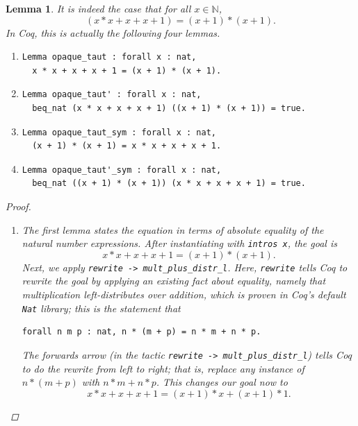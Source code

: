 \documentclass[12pt,notitlepage]{report}
\theoremstyle{plain}
\newtheorem{lem}[theo]{Lemma}
\theoremstyle{definition}
\newcommand\N{\mathbb{N}}
\numberwithin{equation}{section}
\begin{document}
\begin{lem}\label{opaqueness}
    It is indeed the case that for all $x\in \N$,\[
	(x * x + x + x + 1) = (x + 1) * (x + 1).
    \] 
    In Coq, this is actually the following four lemmas.
    \begin{enumerate}
        \item\label{opaqueA} \begin{verbatim}Lemma opaque_taut : forall x : nat, 
  x * x + x + x + 1 = (x + 1) * (x + 1).\end{verbatim}
        \item\label{opaqueB} \begin{verbatim}Lemma opaque_taut' : forall x : nat, 
  beq_nat (x * x + x + x + 1) ((x + 1) * (x + 1)) = true.\end{verbatim}
        \item\label{opaqueC} \begin{verbatim}Lemma opaque_taut_sym : forall x : nat, 
  (x + 1) * (x + 1) = x * x + x + x + 1.\end{verbatim}
        \item\label{opaqueD} \begin{verbatim}Lemma opaque_taut'_sym : forall x : nat, 
  beq_nat ((x + 1) * (x + 1)) (x * x + x + x + 1) = true.\end{verbatim}
    \end{enumerate}
    \begin{proof}
    \begin{enumerate}
        \item 
        The first lemma states the equation in terms of absolute equality of the natural number expressions.  After instantiating with \verb$intros x$, the goal is
        \[
            x * x + x + x + 1 = (x + 1) * (x + 1).
        \]
        Next, we apply \verb$rewrite -> mult_plus_distr_l$.  Here, \verb$rewrite$ tells Coq to rewrite the goal by applying an existing fact about equality, namely that multiplication left-distributes over addition, which is proven in Coq's default \verb$Nat$ library; this is the statement that \begin{verbatim}forall n m p : nat, n * (m + p) = n * m + n * p.\end{verbatim}
        The forwards arrow (in the tactic \texttt{rewrite -> mult\_plus\_distr\_l}) tells Coq to do the rewrite from left to right; that is, replace any instance of $n * (m + p)$ with $n * m + n * p$.  This changes our goal now to
        \[
            x * x + x + x + 1 = (x + 1) * x + (x + 1) * 1.
        \]

\end{enumerate}
\end{proof}
\end{lem}
\end{document}
